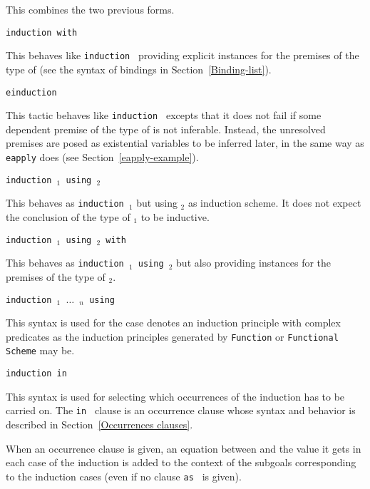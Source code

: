 \begin{coq_example*}
\begin{Variants}
  This combines the two previous forms.

\item{\tt induction {\term} with \bindinglist}

  This behaves like \texttt{induction {\term}} providing explicit
  instances for the premises of the type of {\term} (see the syntax of
  bindings in Section~\ref{Binding-list}).

\item{\tt einduction {\term}}

  This tactic behaves like \texttt{induction {\term}} excepts that it
  does not fail if some dependent premise of the type of {\term} is
  not inferable. Instead, the unresolved premises are posed as
  existential variables to be inferred later, in the same way as {\tt
  eapply} does (see Section~\ref{eapply-example}).

\item {\tt induction {\term$_1$} using {\term$_2$}}

  This behaves as {\tt induction {\term$_1$}} but using {\term$_2$} as
  induction scheme. It does not expect the conclusion of the type of
  {\term$_1$} to be inductive.

\item {\tt induction {\term$_1$} using {\term$_2$} with {\bindinglist}}

  This behaves as {\tt induction {\term$_1$} using {\term$_2$}} but
  also providing instances for the premises of the type of {\term$_2$}.

\item \texttt{induction {\term}$_1$ $\ldots$ {\term}$_n$ using {\qualid}}

  This syntax is used for the case {\qualid} denotes an induction principle
  with complex predicates as the induction principles generated by
  {\tt Function} or {\tt Functional Scheme} may be.

\item \texttt{induction {\term} in {\occgoalset}}

  This syntax is used for selecting which occurrences of {\term} the
  induction has to be carried on. The {\tt in {\atoccurrences}} clause is an
  occurrence clause whose syntax and behavior is described in
  Section~\ref{Occurrences clauses}.

  When an occurrence clause is given, an equation between {\term} and
  the value it gets in each case of the induction is added to the
  context of the subgoals corresponding to the induction cases (even
  if no clause {\tt as {\namingintropattern}} is given).


\end{Variants}
\end{coq_example*}
